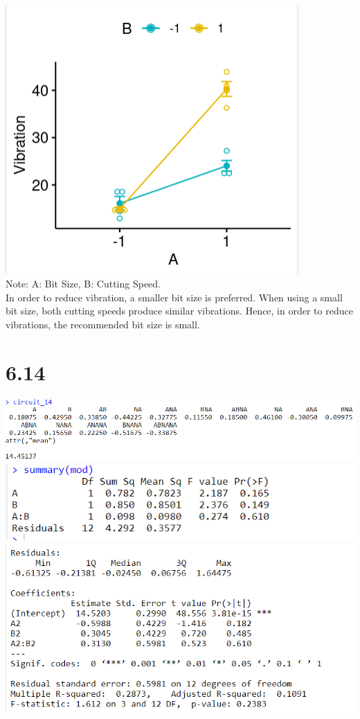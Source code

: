 \documentclass{article}
\begin{document}
\\\includegraphics{6.9c.PNG}
\\Note: A: Bit Size, B: Cutting Speed.
\\In order to reduce vibration, a smaller bit size is preferred. When using a small bit size, both cutting speeds produce similar vibrations. Hence, in order to reduce vibrations, the recommended bit size is small.

\section*{6.14}
\includegraphics{6.14a.PNG}
\\\includegraphics{6.14b.PNG}
\\\includegraphics{6.14c.PNG}
\end{document}
